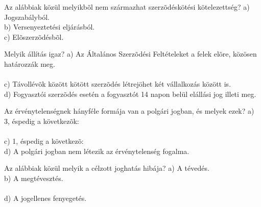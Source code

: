 \begin{frame}

\begin{tcolorbox}[title={152. Kérdés}]
Az alábbiak közül melyikbõl nem származhat szerzõdéskötési kötelezettség?
\tcblower
a) Jogszabályból.\\
b) Versenyeztetési eljárásból.\\
c) Elõszerzõdésbõl.\\
\end{tcolorbox}

\begin{tcolorbox}[title={153. Kérdés}]
Melyik állítás igaz?
\tcblower
a) Az Általános Szerzõdési Feltételeket a felek elõre, közösen határozzák meg.\\
\\
c) Távollévõk között kötött szerzõdés létrejöhet két vállalkozás között is.\\
d) Fogyasztói szerzõdés esetén a fogyasztót 14 napon belül elállási jog illeti meg.
\end{tcolorbox}

\begin{tcolorbox}[title={154. Kérdés}]
Az érvénytelenségnek hányféle formája van a polgári jogban, és melyek ezek?
\tcblower
a) 3, éspedig a következõk:\\
\\
c) 1, éspedig a következõ:\\
d) A polgári jogban nem létezik az érvénytelenség fogalma.
\end{tcolorbox}

\begin{tcolorbox}[title={155. Kérdés}]
Az alábbiak közül melyik a célzott joghatás hibája?
\tcblower
a) A tévedés.\\
b) A megtévesztés.\\
\\
d) A jogellenes fenyegetés.
\end{tcolorbox}

\end{frame}


